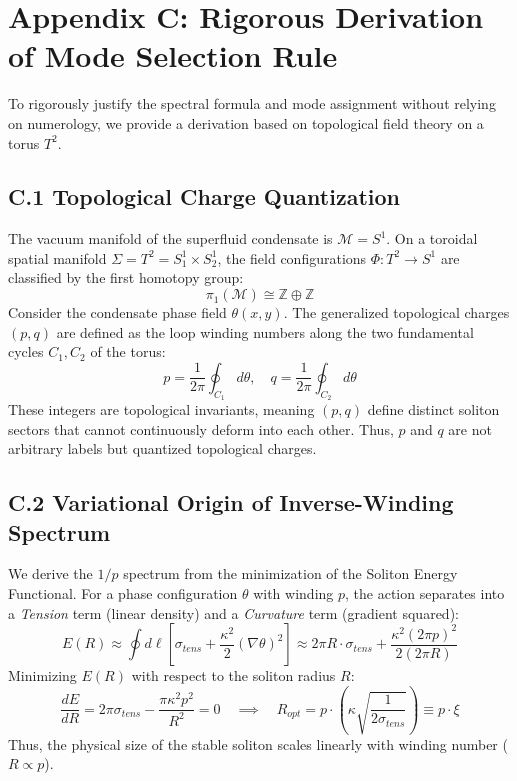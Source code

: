 \documentclass[a4paper,12pt]{article}
\begin{document}
\newpage
\newpage
\section{Appendix C: Rigorous Derivation of Mode Selection Rule}

To rigorously justify the spectral formula and mode assignment without relying on numerology, we provide a derivation based on topological field theory on a torus $T^2$.

\subsection{C.1 Topological Charge Quantization}
The vacuum manifold of the superfluid condensate is $\mathcal{M} = S^1$. On a toroidal spatial manifold $\Sigma = T^2 = S^1_1 \times S^1_2$, the field configurations $\Phi: T^2 \to S^1$ are classified by the first homotopy group:
\begin{equation}
\pi_1(\mathcal{M}) \cong \mathbb{Z} \oplus \mathbb{Z}
\end{equation}
Consider the condensate phase field $\theta(x, y)$. The generalized topological charges $(p, q)$ are defined as the loop winding numbers along the two fundamental cycles $C_1, C_2$ of the torus:
\begin{equation}
p = \frac{1}{2\pi} \oint_{C_1} d\theta, \quad q = \frac{1}{2\pi} \oint_{C_2} d\theta
\end{equation}
These integers are topological invariants, meaning $(p,q)$ define distinct soliton sectors that cannot continuously deform into each other. Thus, $p$ and $q$ are not arbitrary labels but quantized topological charges.

\subsection{C.2 Variational Origin of Inverse-Winding Spectrum}
We derive the $1/p$ spectrum from the minimization of the Soliton Energy Functional.
For a phase configuration $\theta$ with winding $p$, the action separates into a \emph{Tension} term (linear density) and a \emph{Curvature} term (gradient squared):
\begin{equation}
 E(R) \approx \oint d\ell \left[ \sigma_{tens} + \frac{\kappa^2}{2} (\nabla \theta)^2 \right] \approx 2\pi R \cdot \sigma_{tens} + \frac{\kappa^2 (2\pi p)^2}{2 (2\pi R)}
\end{equation}
Minimizing $E(R)$ with respect to the soliton radius $R$:
\begin{equation}
 \frac{dE}{dR} = 2\pi \sigma_{tens} - \frac{\pi \kappa^2 p^2}{R^2} = 0 \quad \implies \quad R_{opt} = p \cdot \left( \kappa \sqrt{\frac{1}{2\sigma_{tens}}} \right) \equiv p \cdot \xi
\end{equation}
Thus, the physical size of the stable soliton scales linearly with winding number ($R \propto p$).
\end{document}
